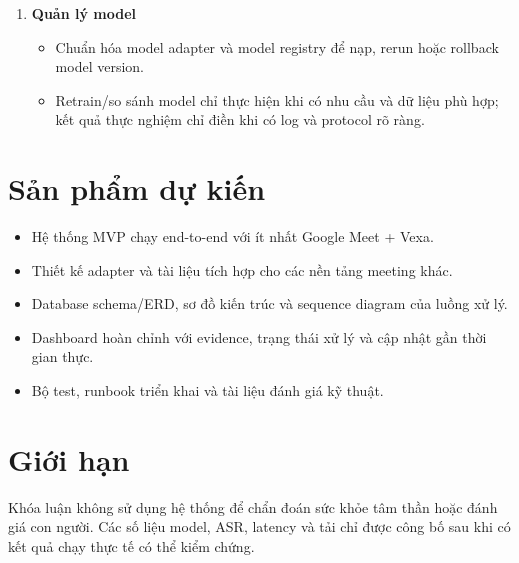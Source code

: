 \documentclass[12pt,a4paper]{article}
\begin{document}
\begin{enumerate}
  \item \textbf{Quản lý model}
  \begin{itemize}
    \item Chuẩn hóa model adapter và model registry để nạp, rerun hoặc rollback model version.
    \item Retrain/so sánh model chỉ thực hiện khi có nhu cầu và dữ liệu phù hợp; kết quả thực nghiệm chỉ điền khi có log và protocol rõ ràng.
  \end{itemize}
\end{enumerate}

\section{Sản phẩm dự kiến}

\begin{itemize}
  \item Hệ thống MVP chạy end-to-end với ít nhất Google Meet + Vexa.
  \item Thiết kế adapter và tài liệu tích hợp cho các nền tảng meeting khác.
  \item Database schema/ERD, sơ đồ kiến trúc và sequence diagram của luồng xử lý.
  \item Dashboard hoàn chỉnh với evidence, trạng thái xử lý và cập nhật gần thời gian thực.
  \item Bộ test, runbook triển khai và tài liệu đánh giá kỹ thuật.
\end{itemize}

\section{Giới hạn}

Khóa luận không sử dụng hệ thống để chẩn đoán sức khỏe tâm thần hoặc đánh giá con người. Các số liệu model, ASR, latency và tải chỉ được công bố sau khi có kết quả chạy thực tế có thể kiểm chứng.
\end{document}
